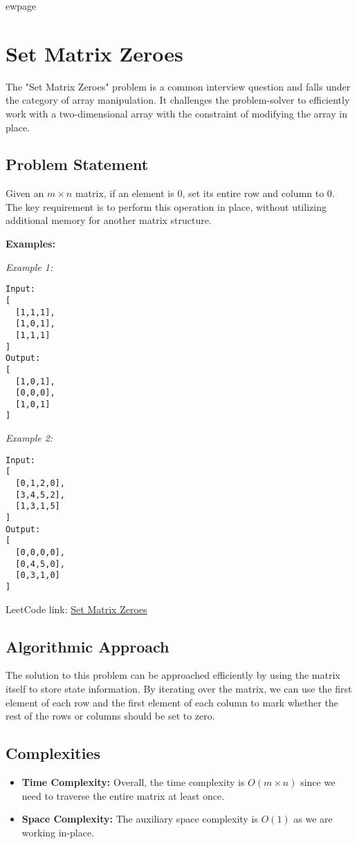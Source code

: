 
ewpage
\chapter{Set Matrix Zeroes}
\label{chap:Set_Matrix_Zeroes}

The "Set Matrix Zeroes" problem is a common interview question and falls under the category of array manipulation. It challenges the problem-solver to efficiently work with a two-dimensional array with the constraint of modifying the array in place.

\section*{Problem Statement}

Given an \(m \times n\) matrix, if an element is \(0\), set its entire row and column to \(0\). The key requirement is to perform this operation in place, without utilizing additional memory for another matrix structure.

\textbf{Examples:}

\textit{Example 1:}

\begin{verbatim}
Input:
[
  [1,1,1],
  [1,0,1],
  [1,1,1]
]
Output:
[
  [1,0,1],
  [0,0,0],
  [1,0,1]
]
\end{verbatim}

\textit{Example 2:}

\begin{verbatim}
Input:
[
  [0,1,2,0],
  [3,4,5,2],
  [1,3,1,5]
]
Output:
[
  [0,0,0,0],
  [0,4,5,0],
  [0,3,1,0]
]
\end{verbatim}

LeetCode link: \href{https://leetcode.com/problems/set-matrix-zeroes/}{Set Matrix Zeroes}

\section*{Algorithmic Approach}

The solution to this problem can be approached efficiently by using the matrix itself to store state information. By iterating over the matrix, we can use the first element of each row and the first element of each column to mark whether the rest of the rows or columns should be set to zero.

\section*{Complexities}
\begin{itemize}
	\item \textbf{Time Complexity:} Overall, the time complexity is \(O(m \times n)\) since we need to traverse the entire matrix at least once.
	\item \textbf{Space Complexity:} The auxiliary space complexity is \(O(1)\) as we are working in-place.
\end{itemize}


